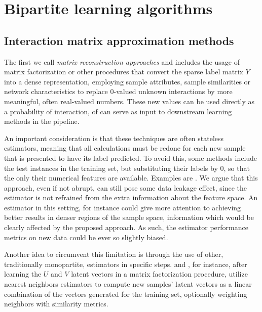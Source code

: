 

\section{Bipartite learning algorithms}

\subsection{Interaction matrix approximation methods}

The first we call \emph{matrix reconstruction approaches} and
includes the usage of matrix factorization or other procedures that convert the
sparse label matrix $Y$ into a dense representation, employing sample
attributes, sample similarities or network characteristics to replace 0-valued
unknown interactions by more meaningful, often real-valued numbers. These new
values can be used directly as a probability of interaction, of can serve as
input to downstream learning methods in the pipeline.

An important consideration is that these techniques are often stateless
estimators, meaning that all calculations must be redone for each new sample
that is presented to have its label predicted. To avoid this, some methods
include the test instances in the training set, but substituting their labels by
0, so that the only their numerical features are available. Examples are
\cite{}. We argue that this approach, even if not abrupt, can still pose some
data leakage effect, since the estimator is not refrained from the extra
information about the feature space. An estimator in this setting, for instance
could give more attention to achieving better results in denser regions of the
sample space, information which would be clearly affected by the proposed
approach. As such, the estimator performance metrics on new data could be ever
so slightly biased.

Another idea to circumvent this limitation is through the use of other,
traditionally monopartite, estimators in specific steps. \cite{} and \cite{},
for instance, after learning the $U$ and $V$ latent vectors in a matrix
factorization procedure, utilize nearest neighbors estimators to compute new
samples' latent vectors as a linear combination of the vectors generated for the
training set, optionally weighting neighbors with similarity metrics.

